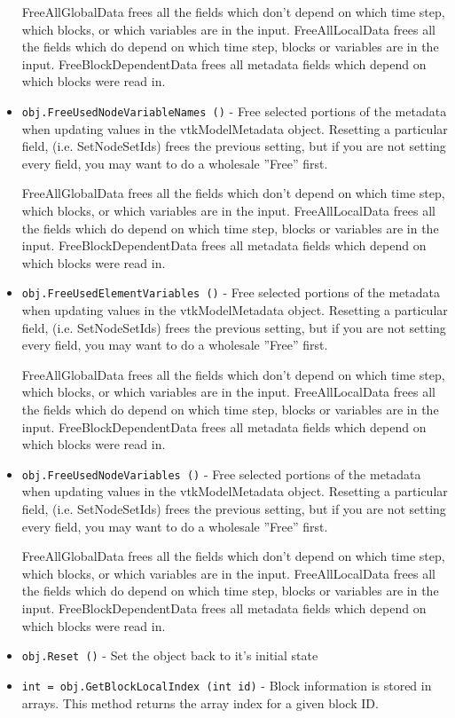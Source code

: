 \begin{itemize}
   FreeAllGlobalData frees all the fields which don't depend on
     which time step, which blocks, or which variables are in the input.
   FreeAllLocalData frees all the fields which do depend on which
     time step, blocks or variables are in the input.
   FreeBlockDependentData frees all metadata fields which depend on
     which blocks were read in.

\item  \verb|obj.FreeUsedNodeVariableNames ()| -    Free selected portions of the metadata when updating values
   in the vtkModelMetadata object.  Resetting a particular field,
   (i.e. SetNodeSetIds) frees the previous setting, but if you
   are not setting every field, you may want to do a wholesale
   ''Free'' first.

   FreeAllGlobalData frees all the fields which don't depend on
     which time step, which blocks, or which variables are in the input.
   FreeAllLocalData frees all the fields which do depend on which
     time step, blocks or variables are in the input.
   FreeBlockDependentData frees all metadata fields which depend on
     which blocks were read in.

\item  \verb|obj.FreeUsedElementVariables ()| -    Free selected portions of the metadata when updating values
   in the vtkModelMetadata object.  Resetting a particular field,
   (i.e. SetNodeSetIds) frees the previous setting, but if you
   are not setting every field, you may want to do a wholesale
   ''Free'' first.

   FreeAllGlobalData frees all the fields which don't depend on
     which time step, which blocks, or which variables are in the input.
   FreeAllLocalData frees all the fields which do depend on which
     time step, blocks or variables are in the input.
   FreeBlockDependentData frees all metadata fields which depend on
     which blocks were read in.

\item  \verb|obj.FreeUsedNodeVariables ()| -    Free selected portions of the metadata when updating values
   in the vtkModelMetadata object.  Resetting a particular field,
   (i.e. SetNodeSetIds) frees the previous setting, but if you
   are not setting every field, you may want to do a wholesale
   ''Free'' first.

   FreeAllGlobalData frees all the fields which don't depend on
     which time step, which blocks, or which variables are in the input.
   FreeAllLocalData frees all the fields which do depend on which
     time step, blocks or variables are in the input.
   FreeBlockDependentData frees all metadata fields which depend on
     which blocks were read in.

\item  \verb|obj.Reset ()| -    Set the object back to it's initial state

\item  \verb|int = obj.GetBlockLocalIndex (int id)| -    Block information is stored in arrays.  This method returns
   the array index for a given block ID.

\end{itemize}

